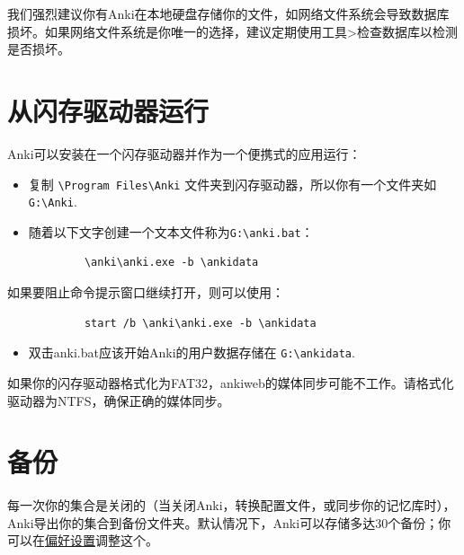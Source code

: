 \documentclass[a4paper]{book}
\begin{document}
		我们强烈建议你有Anki在本地硬盘存储你的文件，如网络文件系统会导致数据库损坏。如果网络文件系统是你唯一的选择，建议定期使用工具>检查数据库以检测是否损坏。
		
		\section{从闪存驱动器运行}
		
		Anki可以安装在一个闪存驱动器并作为一个便携式的应用运行：
		
		\begin{itemize}
			\itemsep1pt\parskip0pt
			\item 复制 \verb|\Program Files\Anki| 文件夹到闪存驱动器，所以你有一个文件夹如 \verb|G:\Anki|.
			\item 随着以下文字创建一个文本文件称为\verb|G:\anki.bat|：
		\end{itemize}
		
		\begin{shaded}\begin{verbatim}
			\anki\anki.exe -b \ankidata
			\end{verbatim}\end{shaded}
		
		如果要阻止命令提示窗口继续打开，则可以使用：
		
		\begin{shaded}\begin{verbatim}
			start /b \anki\anki.exe -b \ankidata
			\end{verbatim}\end{shaded}
		
		\begin{itemize}
			\itemsep1pt\parskip0pt
			\item 双击anki.bat应该开始Anki的用户数据存储在 \verb|G:\ankidata|.
		\end{itemize}
		
		
		\begin{shaded}
			如果你的闪存驱动器格式化为FAT32，ankiweb的媒体同步可能不工作。请格式化驱动器为NTFS，确保正确的媒体同步。
		\end{shaded}
		
		\section{备份}
		每一次你的集合是关闭的（当关闭Anki，转换配置文件，或同步你的记忆库时），Anki导出你的集合到备份文件夹。默认情况下，Anki可以存储多达30个备份；你可以在\hyperref[preferences]{偏好设置}调整这个。
		
\end{document}
